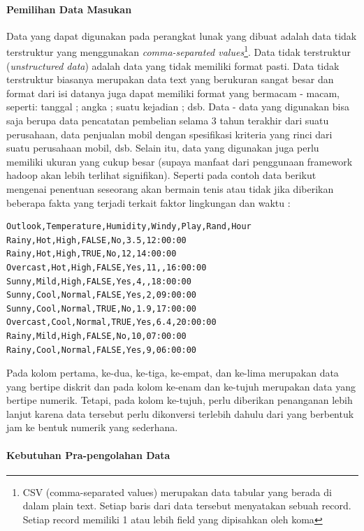 \paragraph{Pemilihan Data Masukan}
Data yang dapat digunakan pada perangkat lunak yang dibuat adalah data tidak terstruktur yang menggunakan \textit{comma-separated values}\footnote{ CSV (comma-separated values) merupakan data tabular yang berada di dalam plain text. Setiap baris dari data tersebut menyatakan sebuah record. Setiap record memiliki 1 atau lebih field yang dipisahkan oleh koma}. Data tidak terstruktur (\textit{unstructured data}) adalah data yang tidak memiliki format pasti. Data tidak terstruktur biasanya merupakan data text yang berukuran sangat besar dan format dari isi datanya juga dapat memiliki format yang bermacam - macam, seperti: tanggal ; angka ; suatu kejadian ; dsb. 
Data - data yang digunakan bisa saja berupa data pencatatan pembelian selama 3 tahun terakhir dari suatu perusahaan, data penjualan mobil dengan spesifikasi kriteria yang rinci dari suatu perusahaan mobil, dsb. Selain itu, data yang digunakan juga perlu memiliki ukuran yang cukup besar (supaya manfaat dari penggunaan framework hadoop akan lebih terlihat signifikan). Seperti pada contoh data berikut mengenai penentuan seseorang akan bermain tenis atau tidak jika diberikan beberapa fakta yang terjadi terkait faktor lingkungan dan waktu :

\begin{lstlisting}
Outlook,Temperature,Humidity,Windy,Play,Rand,Hour
Rainy,Hot,High,FALSE,No,3.5,12:00:00
Rainy,Hot,High,TRUE,No,12,14:00:00
Overcast,Hot,High,FALSE,Yes,11,,16:00:00
Sunny,Mild,High,FALSE,Yes,4,,18:00:00
Sunny,Cool,Normal,FALSE,Yes,2,09:00:00
Sunny,Cool,Normal,TRUE,No,1.9,17:00:00
Overcast,Cool,Normal,TRUE,Yes,6.4,20:00:00
Rainy,Mild,High,FALSE,No,10,07:00:00
Rainy,Cool,Normal,FALSE,Yes,9,06:00:00
\end{lstlisting}
Pada kolom pertama, ke-dua, ke-tiga, ke-empat, dan ke-lima merupakan data yang bertipe diskrit dan pada kolom ke-enam dan ke-tujuh merupakan data yang bertipe numerik. Tetapi, pada kolom ke-tujuh, perlu diberikan penanganan lebih lanjut karena data tersebut perlu dikonversi terlebih dahulu dari yang berbentuk jam ke bentuk numerik yang sederhana.

\paragraph{Kebutuhan Pra-pengolahan Data}

